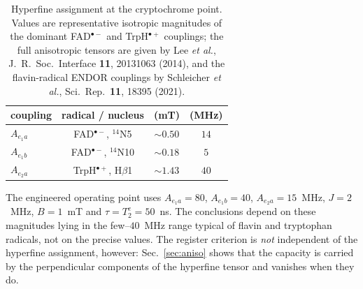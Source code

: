 \documentclass[aps,prx,reprint,superscriptaddress,nofootinbib,floatfix]{revtex4-2}
\begin{document}
\begin{table}[H]
\caption{\label{tab:params}Hyperfine assignment at the cryptochrome point. Values are
representative isotropic magnitudes of the dominant FAD$^{\bullet-}$ and
TrpH$^{\bullet+}$ couplings; the full anisotropic tensors are given by Lee
\textit{et al.}, J.~R.~Soc.~Interface \textbf{11}, 20131063 (2014), and the
flavin-radical ENDOR couplings by Schleicher \textit{et al.}, Sci.~Rep.\
\textbf{11}, 18395 (2021).}
\begin{ruledtabular}
\begin{tabular}{lccc}
coupling & radical / nucleus & (mT) & (MHz) \\
\hline
$A_{e_1a}$ & FAD$^{\bullet-}$, $^{14}$N5 & $\sim0.50$ & $14$ \\
$A_{e_1b}$ & FAD$^{\bullet-}$, $^{14}$N10 & $\sim0.18$ & $5$ \\
$A_{e_2a}$ & TrpH$^{\bullet+}$, H$\beta$1 & $\sim1.43$ & $40$ \\
\end{tabular}
\end{ruledtabular}
\end{table}

The engineered operating point uses $A_{e_1a}=80$, $A_{e_1b}=40$, $A_{e_2a}=15$~MHz,
$J=2$~MHz, $B=1$~mT and $\tau=T_2^e=50$~ns. The conclusions depend on these
magnitudes lying in the few--$40$~MHz range typical of flavin and tryptophan
radicals, not on the precise values. The register criterion is \emph{not}
independent of the hyperfine assignment, however: Sec.~\ref{sec:aniso} shows that
the capacity is carried by the perpendicular components of the hyperfine tensor
and vanishes when they do.
\end{document}
